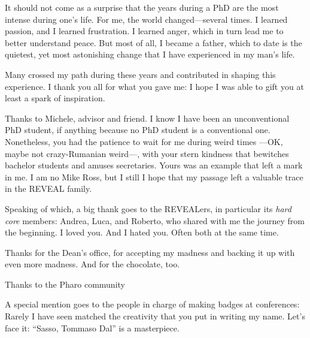 
\begin{acknowledgements}

It should not come as a surprise that the years during a PhD are the most intense during one's life.
For me, the world changed---several times.
I learned passion, and I learned frustration.
I learned anger, which in turn lead me to better understand peace.
But most of all, I became a father, which to date is the quietest, yet most astonishing change that I have experienced in my man's life.

Many crossed my path during these years and contributed in shaping this experience.
I thank you all for what you gave me: I hope I was able to gift you at least a spark of inspiration.

Thanks to Michele, advisor and friend.
I know I have been an unconventional PhD student, if anything because no PhD student is a conventional one.
Nonetheless, you had the patience to wait for me during weird times ---OK, maybe not crazy-Rumanian weird---, with your stern kindness that bewitches bachelor students and amuses secretaries.
Yours was an example that left a mark in me.
I am no Mike Ross, but I still I hope that my passage left a valuable trace in the REVEAL family.

Speaking of which, a big thank goes to the REVEALers, in particular its \emph{hard core} members: Andrea, Luca, and Roberto, who shared with me the journey from the beginning.
I loved you. And I hated you. Often both at the same time.

Thanks for the Dean's office, for accepting my madness and backing it up with even more madness.
And for the chocolate, too.

Thanks to the Pharo community

A special mention goes to the people in charge of making badges at conferences: Rarely I have seen matched the creativity that you put in writing my name.
Let's face it: ``Sasso, Tommaso Dal'' is a masterpiece.


\end{acknowledgements}
